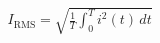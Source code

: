 \documentclass[preview]{standalone}
\begin{document}
\begin{align*}
I_{\mathrm{RMS}} = \sqrt{ \frac{1}{T} \int_0^T i^2(t)\,dt }
\end{align*}
\end{document}
